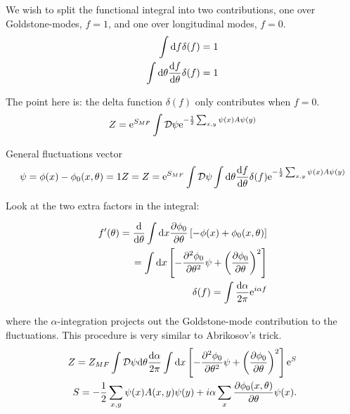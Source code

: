 We wish to split the functional integral into two contributions, one over Goldstone-modes, $f = 1$, and one over longitudinal modes, $f = 0$. \\ 

\begin{align*}
    \int \dd f \delta (f) = 1 \\ 
    \int \dd \theta \dv{f}{\theta} \delta(f) = 1 \\
\end{align*}

The point here is: the delta function $\delta (f)$ only contributes when $f = 0$. \\ 

\begin{align*}
    Z = \mathrm{e}^{S_{MF}}\int \mathcal{D} \psi \mathrm{e}^{-\frac{1}{2}\sum_{x,y} \psi(x) A \psi(y)}
\end{align*}

General fluctuations vector \\ 

\begin{align*}
    \psi = \phi(x) - \phi_{0}(x,\theta) = 1
    Z = Z = \mathrm{e}^{S_{MF}}\int \mathcal{D} \psi \int \dd \theta \dv{f}{\theta} \delta(f) \mathrm{e}^{-\frac{1}{2}\sum_{x,y} \psi(x) A \psi(y)}
\end{align*}

Look at the two extra factors in the integral: 

\begin{align*}
    f'(\theta) = \dv{}{\theta} \int \dd x \pdv{\phi_0}{\theta}\left[-\phi(x) + \phi_0(x,\theta) \right] \\
    = \int \dd x \left[ -\pdv{^2\phi_0}{\theta^2} \psi + \left(\pdv{\phi_0}{\theta}\right)^2 \right] \\ 
    \delta(f) = \int \frac{\dd \alpha}{2\pi}\mathrm{e}^{i\alpha f}
\end{align*}

where the $\alpha$-integration projects out the Goldstone-mode contribution to the fluctuations. This procedure is very similar to Abrikosov's trick. \\ 

\begin{align*}
    Z = Z_{MF} \int \mathcal{D} \psi \dd \theta \frac{\dd \alpha}{2\pi} \int \dd x \left[ -\pdv{^2\phi_0}{\theta^2} \psi + \left(\pdv{\phi_0}{\theta}\right)^2 \right] \mathrm{e}^{S} \\ 
    S = -\frac{1}{2}\sum_{x,y} \psi(x) A(x,y) \psi(y) + i\alpha \sum_x \pdv{\phi_0(x,\theta)}{\theta}\psi(x). 
\end{align*}

